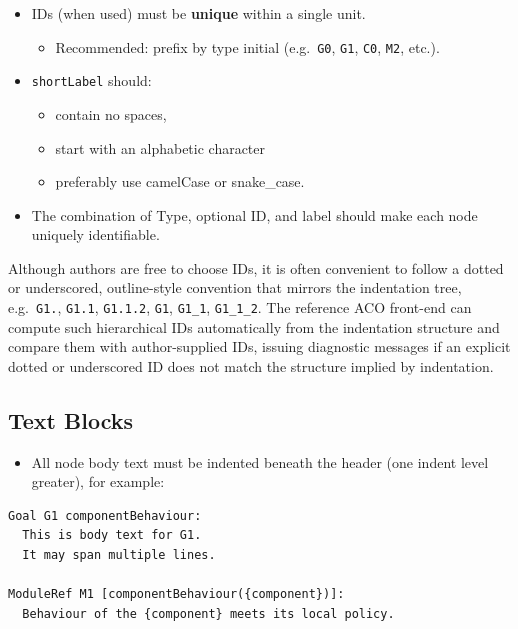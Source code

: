 \documentclass[11pt,twoside,a4paper]{article}
\begin{document}
\begin{itemize}[leftmargin=2em]
  \item IDs (when used) must be \textbf{unique} within a single unit.
  \begin{itemize}[leftmargin=1.5em]
    \item Recommended: prefix by type initial (e.g.\ \texttt{G0}, \texttt{G1}, \texttt{C0}, \texttt{M2}, etc.).
  \end{itemize}

  \item \texttt{shortLabel} should:
  \begin{itemize}[leftmargin=1.5em]
    \item contain no spaces,
    \item start with an alphabetic character
    \item preferably use camelCase or snake\_case.
  \end{itemize}

  \item The combination of Type, optional ID, and label should make each node uniquely identifiable.
\end{itemize}

Although authors are free to choose IDs, it is often convenient to follow a dotted or underscored, outline-style convention that mirrors the indentation tree, e.g.\ \texttt{G1.}, \texttt{G1.1}, \texttt{G1.1.2},
\texttt{G1}, \texttt{G1\_1}, \texttt{G1\_1\_2}. The reference ACO front-end can compute such hierarchical IDs automatically from the indentation structure and compare them with author-supplied IDs, issuing diagnostic messages if an explicit dotted or underscored ID does not match the structure implied by indentation.

\subsection{Text Blocks}

\begin{itemize}[leftmargin=2em]
  \item All node body text must be indented beneath the header (one indent level greater), for example:
\end{itemize}

\begin{verbatim}
Goal G1 componentBehaviour:
  This is body text for G1.
  It may span multiple lines.

ModuleRef M1 [componentBehaviour({component})]:
  Behaviour of the {component} meets its local policy.
\end{verbatim}
\end{document}
